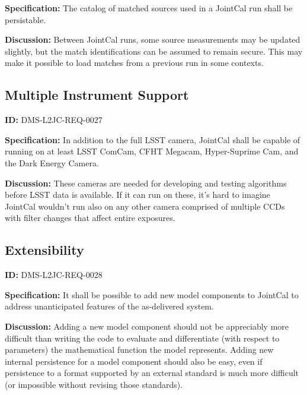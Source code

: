 \documentclass[SE,toc,lsstdraft]{lsstdoc}
\begin{document}
\textbf{Specification:}
The catalog of matched sources used in a JointCal run shall be persistable.

\textbf{Discussion:}
Between JointCal runs, some source measurements may be updated slightly, but the match identifications can be assumed to remain secure.  This may make it possible to load matches from a previous run in some contexts.

\subsection{Multiple Instrument Support}

\label{DMS-L2JC-REQ-0027}
\textbf{ID:} DMS-L2JC-REQ-0027

\textbf{Specification:}
In addition to the full LSST camera, JointCal shall be capable of running on at least LSST ComCam, CFHT Megacam, Hyper-Suprime Cam, and the Dark Energy Camera.

\textbf{Discussion:}
These cameras are needed for developing and testing algorithms before LSST data is available.  If it can run on these, it's hard to imagine JointCal wouldn't run also on any other camera comprised of multiple CCDs with filter changes that affect entire exposures.

\subsection{Extensibility}

\label{DMS-L2JC-REQ-0028}
\textbf{ID:} DMS-L2JC-REQ-0028

\textbf{Specification:}
It shall be possible to add new model components to JointCal to address unanticipated features of the as-delivered system.

\textbf{Discussion:}
Adding a new model component should not be appreciably more difficult than writing the code to evaluate and differentiate (with respect to parameters) the mathematical function the model represents.  Adding new internal persistence for a model component should also be easy, even if persistence to a format supported by an external standard is much more difficult (or impossible without revising those standards).


\end{document}
